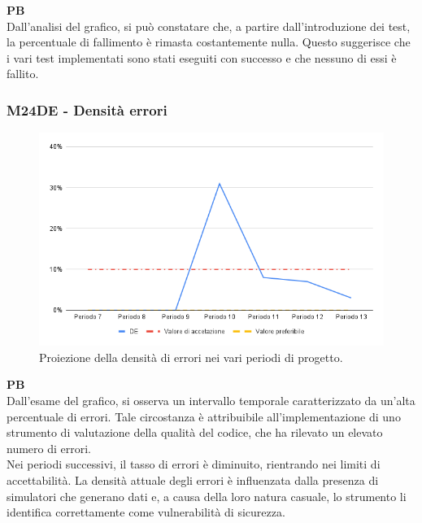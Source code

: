 \textbf{PB} \\
Dall’analisi del grafico, si può constatare che, a partire dall'introduzione dei test, la percentuale di fallimento è rimasta costantemente nulla. Questo suggerisce che i vari test implementati sono stati eseguiti con successo e che nessuno di essi è fallito.

\vspace{0.2cm}


\subsubsection{M24DE - Densità errori}
\begin{figure}[H]
    \centering
    \includegraphics[width=1\textwidth]{../Images/PianoDiQualifica/M24DE.png}
    \caption{Proiezione della densità di errori nei vari periodi di progetto.}
    \label{fig:17}
\end{figure}

\textbf{PB} \\
Dall’esame del grafico, si osserva un intervallo temporale caratterizzato da un’alta percentuale di errori. Tale circostanza è attribuibile all’implementazione di uno strumento di valutazione della qualità del codice, che ha rilevato un elevato numero di errori. \\
Nei periodi successivi, il tasso di errori è diminuito, rientrando nei limiti di accettabilità. La densità attuale degli errori è influenzata dalla presenza di simulatori che generano dati e, a causa della loro natura casuale, lo strumento li identifica correttamente come vulnerabilità di sicurezza. 